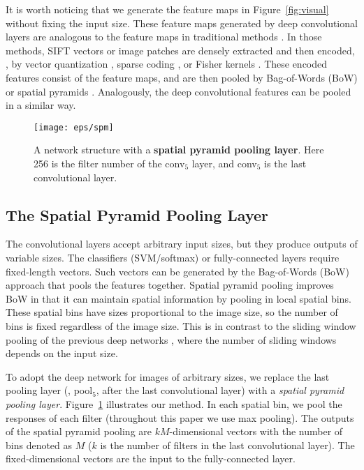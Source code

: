 \documentclass[10pt,journal,cspaper,compsoc]{IEEEtran}
\begin{document}
It is worth noticing that we generate the feature maps in Figure~\ref{fig:visual} without fixing the input size.
These feature maps generated by deep convolutional layers are analogous to the feature maps in traditional methods \cite{Chatfield2011,Coates2011}. In those methods, SIFT vectors \cite{Lowe2004} or image patches \cite{Coates2011} are densely extracted and then encoded, \eg, by vector quantization \cite{Sivic2003,Lazebnik2006,Gemert2008}, sparse coding \cite{Yang2009,Wang2010}, or Fisher kernels \cite{Perronnin2010}. These encoded features consist of the feature maps, and are then pooled by Bag-of-Words (BoW) \cite{Sivic2003} or spatial pyramids \cite{Grauman2005,Lazebnik2006}. Analogously, the deep convolutional features can be pooled in a similar way.

\begin{figure}[t]
\center
\texttt{[image: eps/spm]}
\caption{A network structure with a \textbf{spatial pyramid pooling layer}. Here 256 is the filter number of the conv$_5$ layer, and conv$_5$ is the last convolutional layer.}
\label{fig:spm}
\end{figure}

\subsection{The Spatial Pyramid Pooling Layer}

The convolutional layers accept arbitrary input sizes, but they produce outputs of variable sizes. The classifiers (SVM/softmax) or fully-connected layers require fixed-length vectors. Such vectors can be generated by the Bag-of-Words (BoW) approach \cite{Sivic2003} that pools the features together. Spatial pyramid pooling \cite{Grauman2005,Lazebnik2006} improves BoW in that it can maintain spatial information by pooling in local spatial bins. These spatial bins have sizes proportional to the image size, so the number of bins is fixed regardless of the image size. This is in contrast to the sliding window pooling of the previous deep networks \cite{Krizhevsky2012}, where the number of sliding windows depends on the input size.

To adopt the deep network for images of arbitrary sizes, we replace the last pooling layer (\eg, pool$_5$, after the last convolutional layer) with a \emph{spatial pyramid pooling layer}. Figure~\ref{fig:spm} illustrates our method. In each spatial bin, we pool the responses of each filter (throughout this paper we use max pooling). The outputs of the spatial pyramid pooling are $kM$-dimensional vectors with the number of bins denoted as $M$ ($k$ is the number of filters in the last convolutional layer). The fixed-dimensional vectors are the input to the fully-connected layer.
\end{document}
